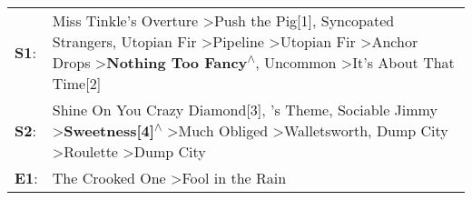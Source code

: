 \begin{supertabular}{p{0.03\textwidth}p{0.92\textwidth}}
 \textbf{S1}:  &  Miss Tinkle's Overture\textsuperscript{} \textgreater \enspace Push the Pig[1]\textsuperscript{}, \enspace Syncopated Strangers\textsuperscript{}, \enspace Utopian Fir\textsuperscript{} \textgreater \enspace Pipeline\textsuperscript{} \textgreater \enspace Utopian Fir\textsuperscript{} \textgreater \enspace Anchor Drops\textsuperscript{} \textgreater \enspace \textbf{Nothing Too Fancy\textsuperscript{$\wedge$}}, \enspace Uncommon\textsuperscript{} \textgreater \enspace It's About That Time[2]\textsuperscript{}  \enspace  \\
 \textbf{S2}:  &                                                                           Shine On You Crazy Diamond[3]\textsuperscript{}, 's Theme\textsuperscript{}, \enspace Sociable Jimmy\textsuperscript{} \textgreater \enspace \textbf{Sweetness[4]\textsuperscript{$\wedge$}} \textgreater \enspace Much Obliged\textsuperscript{} \textgreater \enspace Walletsworth\textsuperscript{}, \enspace Dump City\textsuperscript{} \textgreater \enspace Roulette\textsuperscript{} \textgreater \enspace Dump City\textsuperscript{}  \enspace  \\
 \textbf{E1}:  &                                                                                                                                                                                                                                                                                                                                                                                                                                           The Crooked One\textsuperscript{} \textgreater \enspace Fool in the Rain\textsuperscript{}  \enspace  \\
\end{supertabular}
